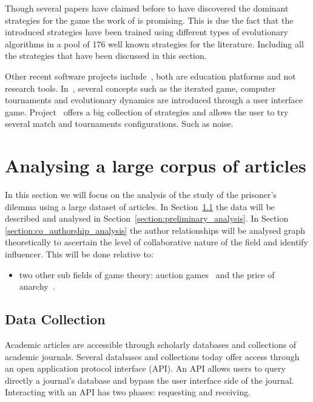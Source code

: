 \documentclass{article}
\theoremstyle{definition}
\begin{document}
Though several papers have claimed before to have discovered the dominant
strategies for the game the work of \cite{Knight2017} is promising.
This is due the fact that the introduced strategies have been trained using
different types of evolutionary algorithms in a pool of 176 well known
strategies for the literature. Including all the strategies that have been
discussed in this section.

Other recent software projects include~\cite{pd_trust, pd_game}, both are education
platforms and not research tools. In~\cite{pd_trust}, several concepts such as
the iterated game, computer tournaments and evolutionary dynamics are introduced
through a user interface game. Project~\cite{pd_game} offers a big collection of
strategies and allows the user to try several match and tournaments configurations.
Such as noise.

\section{Analysing a large corpus of articles}\label{section:analysis}

In this section we will focus on the analysis of the study of the prisoner's dilemma
using a large dataset of articles. In Section~\ref{section:data_collection} the data
will be described and analysed in Section~\ref{section:preliminary_analysis}. In Section
\ref{section:co_authorship_analysis} the author relationships will be analysed graph
theoretically to ascertain the level of collaborative nature of the field and identify
influencer. This will be done relative to:

\begin{itemize}
    \item two other sub fields of game theory: auction games~\cite{menezes2005} and 
    the price of anarchy~\cite{roughgarden2005}.
\end{itemize}

\subsection{Data Collection}\label{section:data_collection}

Academic articles are accessible through scholarly databases and collections of
academic journals. Several databases and collections today offer access through
an open application protocol interface (API). An API allows users to query
directly a journal's database and bypass the user interface side of the journal.
Interacting with an API has two phases: requesting and receiving.
\end{document}
